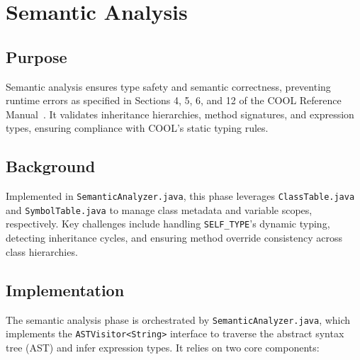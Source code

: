 \documentclass[11pt, titlepage]{article}
\begin{document}
\section{Semantic Analysis}
\label{sec:semantic}

\subsection{Purpose}
Semantic analysis ensures type safety and semantic correctness, preventing runtime errors as specified in Sections 4, 5, 6, and 12 of the COOL Reference Manual~\cite{cool_manual}. It validates inheritance hierarchies, method signatures, and expression types, ensuring compliance with COOL's static typing rules.

\subsection{Background}
Implemented in \texttt{SemanticAnalyzer.java}, this phase leverages \texttt{ClassTable.java} and \texttt{SymbolTable.java} to manage class metadata and variable scopes, respectively. Key challenges include handling \texttt{SELF\_TYPE}'s dynamic typing, detecting inheritance cycles, and ensuring method override consistency across class hierarchies.

\subsection{Implementation}
The semantic analysis phase is orchestrated by \texttt{SemanticAnalyzer.java}, which implements the \texttt{ASTVisitor<String>} interface to traverse the abstract syntax tree (AST) and infer expression types. It relies on two core components:
\end{document}

